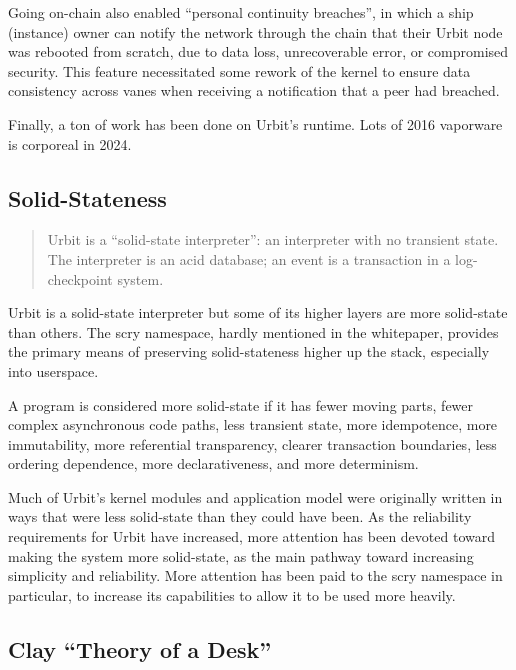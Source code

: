 \documentclass[twoside]{article}
\begin{document}
\sloppy
Going on-chain also enabled ``personal continuity breaches'', in which a ship (instance) owner can notify the network through the chain that their Urbit node was rebooted from scratch, due to data loss, unrecoverable error, or compromised security.  This feature necessitated some rework of the kernel to ensure data consistency across vanes when receiving a notification that a peer had breached.

Finally, a ton of work has been done on Urbit's runtime.  Lots of 2016 vaporware is corporeal in 2024.

\subsection{Solid-Stateness}

\begin{quote}
Urbit is a ``solid-state interpreter'': an interpreter with no
transient state.  The interpreter is an {\sc acid} database; an event
is a transaction in a log-checkpoint system.  \citep{Whitepaper}
\end{quote}

Urbit is a solid-state interpreter but some of its higher layers are more solid-state than others.  The scry namespace, hard\-ly mentioned in the whitepaper, provides the primary means of preserving solid-stateness higher up the stack, especially into userspace.

A program is considered more solid-state if it has fewer moving parts, fewer complex asynchronous code paths, less transient state, more idempotence, more immutability, more referential transparency, clearer transaction boundaries, less ordering dependence, more declarativeness, and more determinism.

Much of Urbit's kernel modules and application model were originally written in ways that were less solid-state than they could have been.  As the reliability requirements for Urbit have increased, more attention has been devoted toward making the system more solid-state, as the main pathway toward increasing simplicity and reliability.  More attention has been paid to the scry namespace in particular, to increase its capabilities to allow it to be used more heavily.

\subsection{Clay “Theory of a Desk”}
\end{document}
